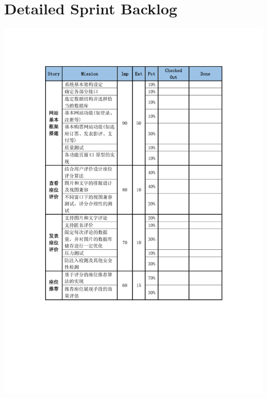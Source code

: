 \documentclass[a4paper]{article}
\begin{document}
\section{Detailed Sprint Backlog}
\begin{table}[H]
  \centering
  \includegraphics[width=\textwidth]{table.pdf}
\end{table}
\end{document}
